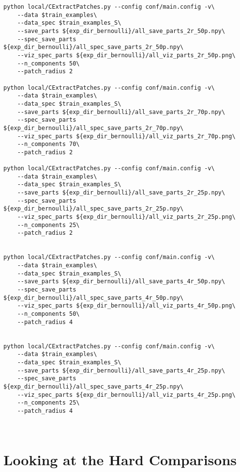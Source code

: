 \documentclass{article}
\begin{document}
\begin{verbatim}
python local/CExtractPatches.py --config conf/main.config -v\
    --data $train_examples\
    --data_spec $train_examples_S\
    --save_parts ${exp_dir_bernoulli}/all_save_parts_2r_50p.npy\
    --spec_save_parts ${exp_dir_bernoulli}/all_spec_save_parts_2r_50p.npy\
    --viz_spec_parts ${exp_dir_bernoulli}/all_viz_parts_2r_50p.png\
    --n_components 50\
    --patch_radius 2

python local/CExtractPatches.py --config conf/main.config -v\
    --data $train_examples\
    --data_spec $train_examples_S\
    --save_parts ${exp_dir_bernoulli}/all_save_parts_2r_70p.npy\
    --spec_save_parts ${exp_dir_bernoulli}/all_spec_save_parts_2r_70p.npy\
    --viz_spec_parts ${exp_dir_bernoulli}/all_viz_parts_2r_70p.png\
    --n_components 70\
    --patch_radius 2

python local/CExtractPatches.py --config conf/main.config -v\
    --data $train_examples\
    --data_spec $train_examples_S\
    --save_parts ${exp_dir_bernoulli}/all_save_parts_2r_25p.npy\
    --spec_save_parts ${exp_dir_bernoulli}/all_spec_save_parts_2r_25p.npy\
    --viz_spec_parts ${exp_dir_bernoulli}/all_viz_parts_2r_25p.png\
    --n_components 25\
    --patch_radius 2


python local/CExtractPatches.py --config conf/main.config -v\
    --data $train_examples\
    --data_spec $train_examples_S\
    --save_parts ${exp_dir_bernoulli}/all_save_parts_4r_50p.npy\
    --spec_save_parts ${exp_dir_bernoulli}/all_spec_save_parts_4r_50p.npy\
    --viz_spec_parts ${exp_dir_bernoulli}/all_viz_parts_4r_50p.png\
    --n_components 50\
    --patch_radius 4


python local/CExtractPatches.py --config conf/main.config -v\
    --data $train_examples\
    --data_spec $train_examples_S\
    --save_parts ${exp_dir_bernoulli}/all_save_parts_4r_25p.npy\
    --spec_save_parts ${exp_dir_bernoulli}/all_spec_save_parts_4r_25p.npy\
    --viz_spec_parts ${exp_dir_bernoulli}/all_viz_parts_4r_25p.png\
    --n_components 25\
    --patch_radius 4



\end{verbatim}

\section{Looking at the Hard Comparisons}
\end{document}
